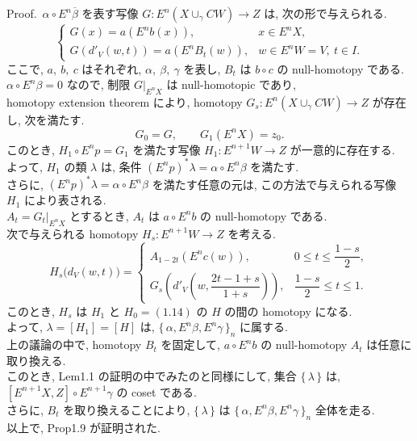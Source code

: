 \documentclass[12pt, leqno]{ltjsarticle}
\newcommand{\Ex}{E}        %
\newcommand{\todai}[2][]{\{\,#2\,\}_{#1}}      %
\newcommand{\gen}[1]{\{\,#1\,\}}       %
\numberwithin{equation}{section}
\theoremstyle{plain}
\theoremstyle{definition}
\theoremstyle{remark}
\begin{document}
Proof.\
\(\alpha\circ E^n\overline{\beta}\) を表す写像 
\(G:E^n(X\cup_\gamma CW)\to Z\) は,
次の形で与えられる.
\[
\begin{cases}
  G(x) = a(E^n b(x)), & x \in E^n X,\\
  G(d'_V(w, t)) = a(E^n B_t(w)), & w \in E^n W = V,\ t \in I.
\end{cases}
\]
ここで,
\(a,\ b,\ c\) はそれぞれ, \(\alpha,\ \beta,\ \gamma\) を表し,
\(B_t\) は \(b\circ c\) の null-homotopy である.\\
\(\alpha\circ E^n\beta = 0\) なので,
制限 \(G|_{E^n X}\) は null-homotopic であり,\\
homotopy extension theorem により, 
homotopy \(G_s:E^n(X\cup_\gamma CW) \to Z\)
が存在し, 次を満たす.
\[
G_0 = G,\qquad 
G_1(E^n X) = z_0.
\]
このとき,
\(H_1\circ E^n p = G_1\) を満たす写像 
\(H_1 : E^{n+1}W \to Z\)
が一意的に存在する.\\
よって,
\(H_1\) の類 \(\lambda\) は, 
条件 \((E^n p)^*\lambda = \alpha\circ E^n\beta\)
を満たす.\\
さらに, 
\((E^n p)^*\lambda = \alpha\circ E^n\beta\)
を満たす任意の元は, 
この方法で与えられる写像 \(H_1\) により表される.\\
\(A_t = G_t|_{E^n X}\) とするとき,
\(A_t\) は \(a\circ E^n b\) の null-homotopy である.\\
次で与えられる homotopy 
$H_s:E^{n+1}W\to Z$ を考える.
\[
H_s\bigl(d_V(w,t)\bigr)=
\begin{cases}
A_{1-2t}\!\left(E^n c(w)\right), 
& 0\le t\le \dfrac{1-s}{2},\\
G_s\!\left(d'_V\!\left(w,\dfrac{2t-1+s}{1+s}\right)\right), 
& \dfrac{1-s}{2}\le t\le 1.
\end{cases}
\]
このとき, 
$H_s$ は $H_1$ と $H_0= (1.14) \text{ の }H$ の間の homotopy になる. \\
よって,
\(\lambda = [H_1] = [H]\) は,
\(\todai[n]{\alpha,\Ex^n\beta,\Ex^n\gamma}\) に属する.\\
上の議論の中で,
homotopy \(B_t\)
を固定して,
\(a\circ E^n b\) の null-homotopy \(A_t\) は任意に取り換える.\\
このとき,
Lem1.1 の証明の中でみたのと同様にして,
集合 \(\gen{\lambda}\) は,
\([E^{n+1}X, Z]\circ E^{n+1}\gamma\) の coset である.\\
さらに,
\(B_t\) を取り換えることにより,
\(\gen{\lambda}\) は
\(\todai[n]{\alpha, E^n\beta, E^n\gamma}\)
全体を走る.\\
以上で, Prop1.9 が証明された. 
\quad
\end{document}
